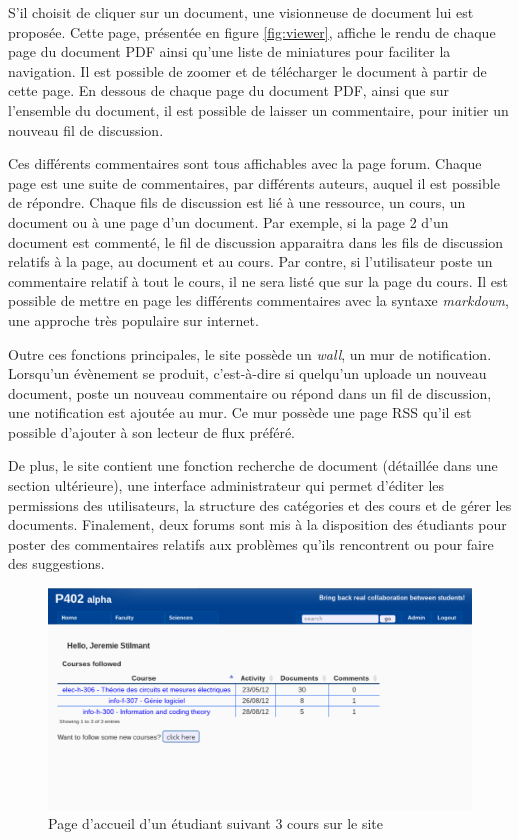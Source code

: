 \documentclass[a4paper,12pt]{article}
\begin{document}
S'il choisit de cliquer sur un document, une visionneuse de document lui est proposée.
Cette page, présentée en figure \ref{fig:viewer}, affiche le rendu de chaque page
du document PDF ainsi qu'une liste de miniatures pour faciliter la navigation. Il
est possible de zoomer et de télécharger le document à partir de cette page. En
dessous de chaque page du document PDF, ainsi que sur l'ensemble du document, il
est possible de laisser un commentaire, pour initier un nouveau fil de discussion.

Ces différents commentaires sont tous affichables avec la page forum. Chaque page
est une suite de commentaires, par différents auteurs, auquel il est possible
de répondre. Chaque fils de discussion est lié à une ressource, un cours, un
document ou à une page d'un document. Par exemple, si la page 2 d'un document
est commenté, le fil de discussion apparaitra dans les fils de discussion
relatifs à la page, au document et au cours. Par contre, si l'utilisateur
poste un commentaire relatif à tout le cours, il ne sera listé que sur la page
du cours. Il est possible de mettre en page les différents commentaires avec la syntaxe
\textit{markdown}, une approche très populaire sur internet.

Outre ces fonctions principales, le site possède un \textit{wall}, un mur
de notification. Lorsqu'un évènement se produit, c'est-à-dire
si quelqu'un uploade un nouveau document, poste un nouveau commentaire ou répond
dans un fil de discussion, une notification est ajoutée au mur. Ce mur possède
une page RSS qu'il est possible d'ajouter à son lecteur de flux préféré.

De plus, le site contient une fonction recherche de document (détaillée dans une
section ultérieure), une interface administrateur qui permet d'éditer les permissions
des utilisateurs, la structure des catégories et des cours et de gérer les documents.
Finalement, deux forums sont mis à la disposition des étudiants pour poster
des commentaires relatifs aux problèmes qu'ils rencontrent ou pour faire des suggestions.

\begin{figure}
  \centering\includegraphics[scale=0.5]{imgs/home.pdf}
  \caption{Page d'accueil d'un étudiant suivant 3 cours sur le site}
  \label{fig:home}
\end{figure}
\end{document}
